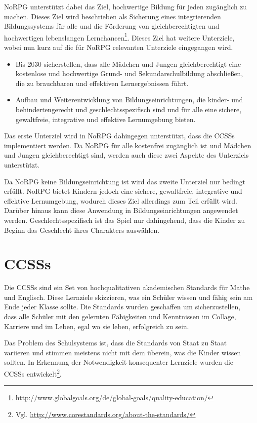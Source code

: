 NoRPG unterstützt dabei das Ziel, hochwertige Bildung für jeden zugänglich zu machen. Dieses Ziel wird beschrieben als Sicherung eines integrierenden Bildungssystems für alle und die Förderung von gleichberechtigten und hochwertigen lebenslangen Lernchancen\footnote{\url{http://www.globalgoals.org/de/global-goals/quality-education/}}. Dieses Ziel hat weitere Unterziele, wobei nun kurz auf die für NoRPG relevanten Unterziele eingegangen wird.

\begin{itemize}
\item Bis 2030 sicherstellen, dass alle Mädchen und Jungen gleichberechtigt eine kostenlose und hochwertige Grund- und Sekundarschulbildung abschließen, die zu brauchbaren und effektiven Lernergebnissen führt.

\item Aufbau und Weiterentwicklung von Bildungseinrichtungen, die kinder- und behindertengerecht und geschlechtsspezifisch sind und für alle eine sichere, gewaltfreie, integrative und effektive Lernumgebung bieten.
\end{itemize}

Das erste Unterziel wird in NoRPG dahingegen unterstützt, dass die \acfp{CCSS} implementiert werden. Da NoRPG für alle kostenfrei zugänglich ist und Mädchen und Jungen gleichberechtigt sind, werden auch diese zwei Aspekte des Unterziels unterstützt. 

Da NoRPG keine Bildungseinrichtung ist wird das zweite Unterziel nur bedingt erfüllt. NoRPG bietet Kindern jedoch eine sichere, gewaltfreie, integrative und effektive Lernumgebung, wodurch dieses Ziel allerdings zum Teil erfüllt wird. Darüber hinaus kann diese Anwendung in Bildungseinrichtungen angewendet werden. Geschlechtsspezifisch ist das Spiel nur dahingehend, dass die Kinder zu Beginn das Geschlecht ihres Charakters auswählen.

\section{\aclp{CCSS}}
Die \acp{CCSS} sind ein Set von hochqualitativen akademischen Standards für Mathe und Englisch. Diese Lernziele skizzieren, was ein Schüler wissen und fähig sein am Ende jeder Klasse sollte. Die Standards wurden geschaffen um sicherzustellen, dass alle Schüler mit den gelernten Fähigkeiten und Kenntnissen im Collage, Karriere und im Leben, egal wo sie leben, erfolgreich zu sein.

Das Problem des Schulsystems ist, dass die Standards von Staat zu Staat variieren und stimmen meistens nicht mit dem überein, was die Kinder wissen sollten. In Erkennung der Notwendigkeit konsequenter Lernziele wurden die \acp{CCSS} entwickelt\footnote{Vgl. \url{http://www.corestandards.org/about-the-standards/}}.

